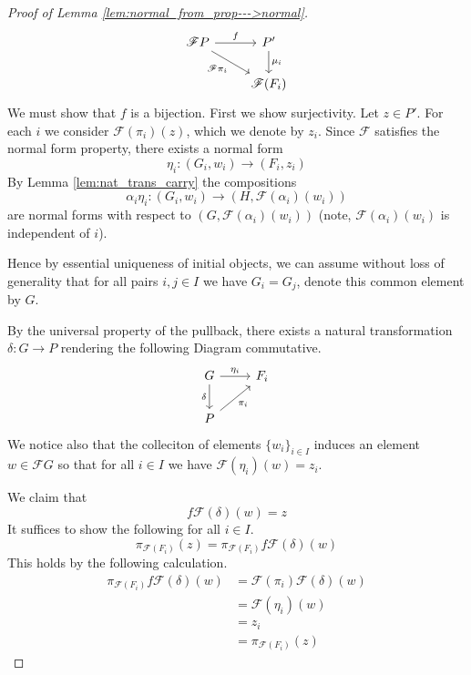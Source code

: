 \documentclass[12pt]{article}
\theoremstyle{plain}
\theoremstyle{definition}
\newcommand{\scr}[1]{\mathscr{#1}}
\newcommand{\lto}{\longrightarrow}
\begin{document}
\begin{proof}[Proof of Lemma \ref{lem:normal_from_prop--->normal}]
		\begin{equation}
			\begin{tikzcd}\label{eq:induced_commutativity}
				\scr{F}P\arrow[r,"{f}"]\arrow[dr,swap,"{\scr{F}\pi_i}"] & P'\arrow[d,"{\mu_i}"]\\
				& \scr{F}(F_i)
				\end{tikzcd}
			\end{equation}
		We must show that $f$ is a bijection. First we show surjectivity. Let $z \in P'$. For each $i$ we consider $\scr{F}(\pi_i)(z)$, which we denote by $z_i$. Since $\scr{F}$ satisfies the normal form property, there exists a normal form
		\begin{equation}
			\eta_i: (G_i, w_i) \lto (F_i, z_i)
			\end{equation}
		By Lemma \ref{lem:nat_trans_carry} the compositions
		\begin{equation}
			\alpha_i \eta_i: (G_i, w_i) \lto (H, \scr{F}(\alpha_i)(w_i))
			\end{equation}
		are normal forms with respect to $(G, \scr{F}(\alpha_i)(w_i))$ (note, $\scr{F}(\alpha_i)(w_i)$ is independent of $i$).
		
		Hence by essential uniqueness of initial objects, we can assume without loss of generality that for all pairs $i,j \in I$ we have $G_i = G_j$, denote this common element by $G$.
		
		By the universal property of the pullback, there exists a natural transformation $\delta: G \lto P$ rendering the following Diagram commutative.
		\begin{equation}
			\begin{tikzcd}
				G\arrow[d,swap,"{\delta}"]\arrow[r,"{\eta_i}"] & F_i\\
				P\arrow[ur,swap,"{\pi_i}"]
				\end{tikzcd}
			\end{equation}
		We notice also that the colleciton of elements $\lbrace w_i \rbrace_{i \in I}$ induces an element $w \in \scr{F}G$ so that for all $i \in I$ we have $\scr{F}(\eta_i)(w) = z_i$.
	
		We claim that
		\begin{equation}
			f\scr{F}(\delta)(w) = z
			\end{equation}
		It suffices to show the following for all $i \in I$.
		\begin{equation}
			\pi_{\scr{F}(F_i)}(z) = \pi_{\scr{F}(F_i)}f\scr{F}(\delta)(w)
			\end{equation}
		This holds by the following calculation.
		\begin{align}
			\pi_{\scr{F}(F_i)}f\scr{F}(\delta)(w) &= \scr{F}(\pi_i) \scr{F}(\delta)(w)\\
			&= \scr{F}(\eta_i)(w)\\
			&= z_i\\
			&= \pi_{\scr{F}(F_i)}(z)
			\end{align}
		

\end{proof}
\end{document}
